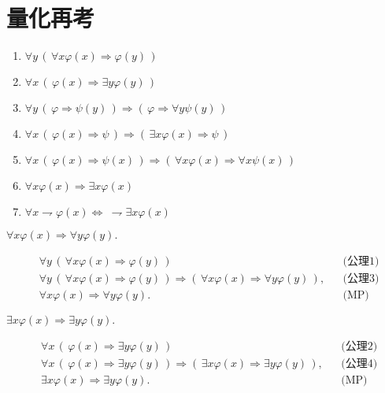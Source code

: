 \section{量化再考}
	\begin{enumerate}
		\item $\forall y\, \left(\, \forall x \varphi(x) \Longrightarrow \varphi(y)\, \right)$
		\item $\forall x\, \left(\, \varphi(x) \Longrightarrow \exists y \varphi(y)\, \right)$
		\item $\forall y\, \left(\, \varphi \Longrightarrow \psi(y)\, \right)
			\Longrightarrow \left(\, \varphi \Longrightarrow \forall y \psi(y)\, \right)$
		\item $\forall x\, \left(\, \varphi(x) \Longrightarrow \psi\, \right)
			\Longrightarrow \left(\, \exists x \varphi(x) \Longrightarrow \psi\, \right)$
		\item $\forall x\,  \left(\, \varphi(x) \Longrightarrow \psi(x)\, \right)
			\Longrightarrow \left(\, \forall x \varphi(x) \Longrightarrow \forall x \psi(x)\, \right)$
			
		\item $\forall x \varphi(x) \Longrightarrow \exists x \varphi(x)$
		\item $\forall x \rightharpoondown \varphi(x) \Longleftrightarrow
			\ \rightharpoondown \exists x \varphi(x)$
	\end{enumerate}
	
	\begin{screen}
		$\forall x \varphi(x) \Longrightarrow \forall y \varphi(y).$
	\end{screen}
	
	\begin{align}
		&\forall y\, \left(\, \forall x \varphi(x) \Longrightarrow \varphi(y)\, \right)
		&& \mbox{(公理1)} \\
		&\forall y\, \left(\, \forall x \varphi(x) \Longrightarrow \varphi(y)\, \right)
		\Longrightarrow \left(\, \forall x \varphi(x) \Longrightarrow \forall y \varphi(y)\, \right),
		&& \mbox{(公理3)} \\
		&\forall x \varphi(x) \Longrightarrow \forall y \varphi(y).
		&& \mbox{(MP)}
	\end{align}
	
	\begin{screen}
		$\exists x \varphi(x) \Longrightarrow \exists y \varphi(y).$
	\end{screen}
	
	\begin{align}
		&\forall x\, \left(\, \varphi(x) \Longrightarrow \exists y \varphi(y)\, \right)
		&& \mbox{(公理2)} \\
		&\forall x\, \left(\, \varphi(x) \Longrightarrow \exists y \varphi(y)\, \right)
		\Longrightarrow \left(\, \exists x \varphi(x) \Longrightarrow \exists y \varphi(y)\, \right),
		&& \mbox{(公理4)} \\
		&\exists x \varphi(x) \Longrightarrow \exists y \varphi(y).
		&& \mbox{(MP)}
	\end{align}
	
